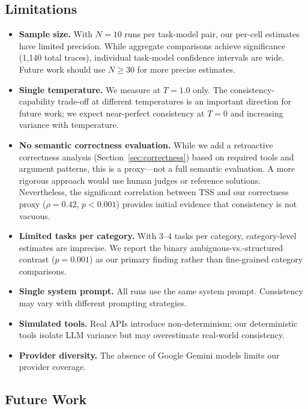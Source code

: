 \documentclass[letterpaper]{article}
\begin{document}
\subsection{Limitations}
\label{sec:limitations}

\begin{itemize}[nosep]
    \item \textbf{Sample size.} With $N = 10$ runs per task-model pair, our per-cell estimates have limited precision. While aggregate comparisons achieve significance (1,140 total traces), individual task-model confidence intervals are wide. Future work should use $N \geq 30$ for more precise estimates.
    \item \textbf{Single temperature.} We measure at $T = 1.0$ only. The consistency-capability trade-off at different temperatures is an important direction for future work; we expect near-perfect consistency at $T = 0$ and increasing variance with temperature.
    \item \textbf{No semantic correctness evaluation.} While we add a retroactive correctness analysis (Section~\ref{sec:correctness}) based on required tools and argument patterns, this is a proxy---not a full semantic evaluation. A more rigorous approach would use human judges or reference solutions. Nevertheless, the significant correlation between TSS and our correctness proxy ($\rho = 0.42$, $p < 0.001$) provides initial evidence that consistency is not vacuous.
    \item \textbf{Limited tasks per category.} With 3--4 tasks per category, category-level estimates are imprecise. We report the binary ambiguous-vs.-structured contrast ($p = 0.001$) as our primary finding rather than fine-grained category comparisons.
    \item \textbf{Single system prompt.} All runs use the same system prompt. Consistency may vary with different prompting strategies.
    \item \textbf{Simulated tools.} Real APIs introduce non-determinism; our deterministic tools isolate LLM variance but may overestimate real-world consistency.
    \item \textbf{Provider diversity.} The absence of Google Gemini models limits our provider coverage.
\end{itemize}

\subsection{Future Work}
\end{document}

